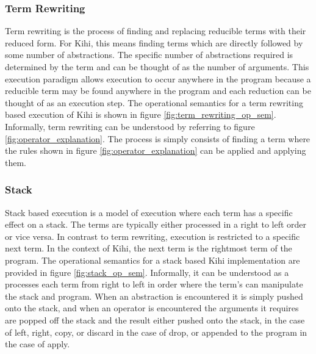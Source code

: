 \subsubsection{Term Rewriting}
Term rewriting is the process of finding
and replacing reducible terms with their reduced form. For Kihi,
this means finding terms which are directly followed by
some number of abstractions. The specific number of abstractions
required is determined by the term and can be thought of as the
number of arguments. This execution paradigm allows execution
to occur anywhere in the program because a reducible term may
be found anywhere in the program and each reduction can be
thought of as an execution step. The operational semantics for a term rewriting based execution of
Kihi is shown in figure \ref{fig:term_rewriting_op_sem}. Informally, term rewriting can be understood by referring to figure \ref{fig:operator_explanation}. The process is simply consists of finding a term where the rules shown in figure \ref{fig:operator_explanation} can be applied and applying them.

\subsubsection{Stack}
Stack based execution is a model of execution where each term has a specific effect on a stack. The terms are typically either processed in a right to left order or vice versa. In contrast to term rewriting, execution is restricted to a specific next term. In the context of Kihi, the next term is the rightmost term of the program. The operational semantics for a stack based Kihi implementation are provided in figure \ref{fig:stack_op_sem}. Informally, it can be understood as a processes each term from right to left in order where the term's can manipulate the stack and program. When an abstraction is encountered it is simply pushed onto the stack, and when an operator is encountered the arguments it requires are popped off the stack and the result either pushed onto the stack, in the case of left, right, copy, or discard in the case of drop, or appended to the program in the case of apply.





